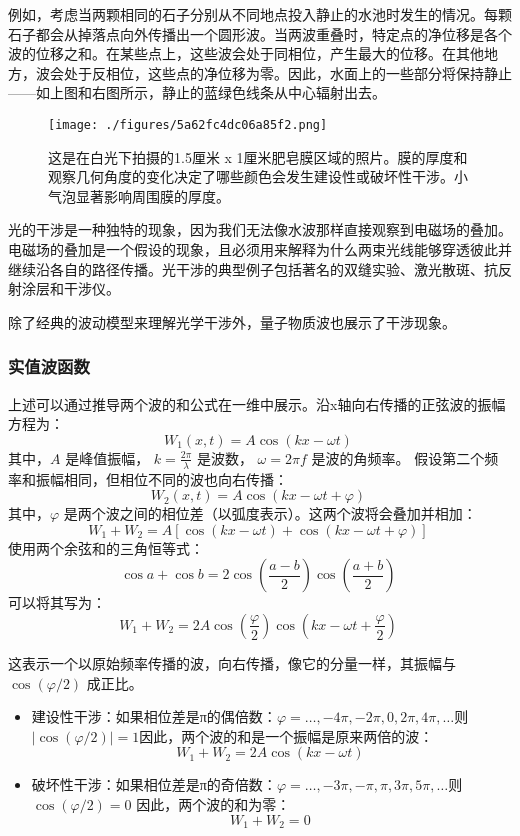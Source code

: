 例如，考虑当两颗相同的石子分别从不同地点投入静止的水池时发生的情况。每颗石子都会从掉落点向外传播出一个圆形波。当两波重叠时，特定点的净位移是各个波的位移之和。在某些点上，这些波会处于同相位，产生最大的位移。在其他地方，波会处于反相位，这些点的净位移为零。因此，水面上的一些部分将保持静止——如上图和右图所示，静止的蓝绿色线条从中心辐射出去。
\begin{figure}[ht]
\centering
\texttt{[image: ./figures/5a62fc4dc06a85f2.png]}
\caption{这是在白光下拍摄的1.5厘米 x 1厘米肥皂膜区域的照片。膜的厚度和观察几何角度的变化决定了哪些颜色会发生建设性或破坏性干涉。小气泡显著影响周围膜的厚度。} \label{fig_GSWLX_5}
\end{figure}
光的干涉是一种独特的现象，因为我们无法像水波那样直接观察到电磁场的叠加。电磁场的叠加是一个假设的现象，且必须用来解释为什么两束光线能够穿透彼此并继续沿各自的路径传播。光干涉的典型例子包括著名的双缝实验、激光散斑、抗反射涂层和干涉仪。

除了经典的波动模型来理解光学干涉外，量子物质波也展示了干涉现象。
\subsubsection{实值波函数} 
上述可以通过推导两个波的和公式在一维中展示。沿x轴向右传播的正弦波的振幅方程为：  
\[
W_1(x,t) = A \cos(kx - \omega t)~
\]
其中，\(A\) 是峰值振幅，  
\(k = \frac{2\pi}{\lambda}\) 是波数，  
\(\omega = 2\pi f\) 是波的角频率。  
假设第二个频率和振幅相同，但相位不同的波也向右传播：  
\[
W_2(x,t) = A \cos(kx - \omega t + \varphi)~
\]
其中，\(\varphi\) 是两个波之间的相位差（以弧度表示）。这两个波将会叠加并相加：  
\[
W_1 + W_2 = A \left[ \cos(kx - \omega t) + \cos(kx - \omega t + \varphi) \right]~
\]
使用两个余弦和的三角恒等式：  
\[
\cos a + \cos b = 2 \cos \left( \frac{a - b}{2} \right) \cos \left( \frac{a + b}{2} \right)~
\]
可以将其写为：  
\[
W_1 + W_2 = 2A \cos \left( \frac{\varphi}{2} \right) \cos \left( kx - \omega t + \frac{\varphi}{2} \right)~
\]

这表示一个以原始频率传播的波，向右传播，像它的分量一样，其振幅与 \(\cos(\varphi/2)\) 成正比。
\begin{itemize}
\item 建设性干涉：如果相位差是π的偶倍数：\(\varphi = \ldots, -4\pi, -2\pi, 0, 2\pi, 4\pi, \ldots\)则\(|\cos(\varphi / 2)| = 1\)因此，两个波的和是一个振幅是原来两倍的波：  
\[
W_1 + W_2 = 2A \cos(kx - \omega t)~
\]
\item 破坏性干涉：如果相位差是π的奇倍数：\(\varphi = \ldots, -3\pi, -\pi, \pi, 3\pi, 5\pi, \ldots\)则\(\cos(\varphi / 2) = 0\)
因此，两个波的和为零：  
\[
W_1 + W_2 = 0~
\]
\end{itemize}
